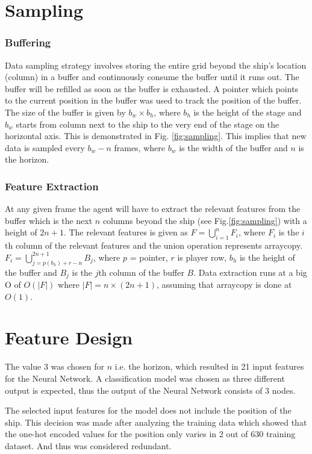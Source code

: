 \documentclass[10pt,journal,compsoc]{IEEEtran}
\begin{document}
\section{Sampling}
\subsubsection*{Buffering}
Data sampling strategy involves storing the entire grid beyond the ship's location (column) in a buffer and 
continuously consume the buffer until it runs out. The buffer will be refilled as soon as the buffer is 
exhausted. A pointer which points to the current position in the buffer was used to track the position of 
the buffer. The size of the buffer is given by $b_w \times b_h$, where $b_h$ is the height of the stage and 
$b_w$ starts from column next to the ship to the very end of the stage on the horizontal axis. 
This is demonstrated in Fig. \ref{fig:sampling}. This implies that new data is sampled every
$b_w - n$ frames, where $b_w$ is the width of the buffer and $n$ is the horizon. 
\subsubsection*{Feature Extraction} 
At any given frame the agent will have to extract the relevant features from the buffer which is the next $n$
columns beyond the ship (see Fig.\ref{fig:sampling}) with a height of $2n + 1$. The relevant features is given
as $F = \bigcup\limits_{i=1}^{n}F_i$, where $F_i$ is the $i$th column of the relevant features and the union 
operation represents arraycopy. $F_i = \bigcup\limits_{j = p(b_h) + r - n}^{2n + 1} B_j$, where $p$ = pointer,
 $r$ is player row, $b_h$ is the height of the buffer and $B_j$ is the $j$th column of the 
buffer $B$. Data extraction runs at a big O of $O(|F|)$ where $|F|=n \times (2n+1)$, assuming that arraycopy
is done at $O(1)$.


\section{Feature Design}

The value 3 was chosen for $n$ i.e. the horizon, which resulted in 21 input features for the Neural Network. 
A classification model was chosen as three different output is expected, thus the output of the Neural 
Network consists of 3 nodes.
 
The selected input features for the model does not include the position of the ship. This decision was made 
after analyzing the training data which showed that the one-hot encoded values for the position only varies
in 2 out of 630 training dataset. And thus was considered redundant.
\end{document}
